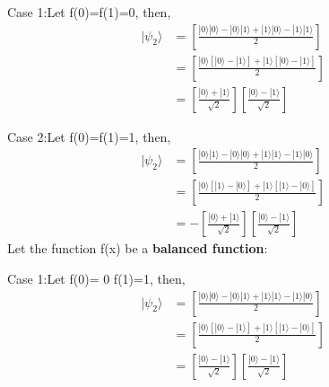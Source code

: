 \documentclass[12pt]{report}
\begin{document}
Case 1:\quad Let f(0)=f(1)=0, then,
\begin{equation}\label{e1}
\begin{split}
|\psi_{2}\rangle & = \left[\frac{|0\rangle|0\rangle - |0\rangle|1\rangle + |1\rangle|0\rangle - |1\rangle|1\rangle }{2}\right] \\ 
&= \left[\frac{|0\rangle\left[|0\rangle - |1\rangle\right] + |1\rangle\left[|0\rangle - |1\rangle\right]}{2}\right] \\
& = \left[\frac{|0\rangle+|1\rangle}{\sqrt{2}}\right]\left[\frac{|0\rangle-|1\rangle}{\sqrt{2}}\right] 
\end{split}
\end{equation}
\newline

Case 2:\quad Let f(0)=f(1)=1, then,
\begin{equation}\label{e2}
\begin{split}
|\psi_{2}\rangle &= \left[\frac{|0\rangle|1\rangle - |0\rangle|0\rangle + |1\rangle|1\rangle - |1\rangle|0\rangle }{2}\right] \\ 
& = \left[\frac{|0\rangle\left[|1\rangle - |0\rangle\right] + |1\rangle\left[|1\rangle - |0\rangle\right]}{2}\right] \\
& = - \left[\frac{|0\rangle+|1\rangle}{\sqrt{2}}\right]\left[\frac{|0\rangle-|1\rangle}{\sqrt{2}}\right]
\end{split}
\end{equation}
\newline\newline\newline Let the function f(x) be a \textbf{balanced function}:

Case 1:\quad Let f(0)= 0 f(1)=1, then,
\begin{equation}\label{e3}
\begin{split}
|\psi_{2}\rangle & = \left[\frac{|0\rangle|0\rangle - |0\rangle|1\rangle + |1\rangle|1\rangle - |1\rangle|0\rangle }{2}\right] \\
& = \left[\frac{|0\rangle\left[|0\rangle - |1\rangle\right] + |1\rangle\left[|1\rangle - |0\rangle\right]}{2}\right] \\
& = \left[\frac{|0\rangle-|1\rangle}{\sqrt{2}}\right]\left[\frac{|0\rangle-|1\rangle}{\sqrt{2}}\right] 
\end{split}
\end{equation}
\newline
\end{document}
